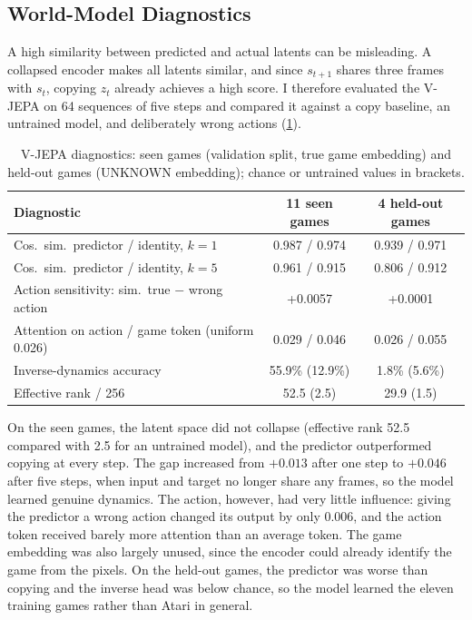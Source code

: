 \documentclass[runningheads]{llncs}
\begin{document}
\FloatBarrier
\subsection{World-Model Diagnostics}
\label{sec:jepa-diag}

A high similarity between predicted and actual latents can be misleading. A collapsed encoder
makes all latents similar, and since $s_{t+1}$ shares three frames with $s_t$, copying $z_t$
already achieves a high score. I therefore evaluated the V-JEPA on 64 sequences of five steps
and compared it against a copy baseline, an untrained model, and deliberately wrong actions
(\cref{tab:jepa}).

\begin{table}[!htbp]
\centering
\caption{V-JEPA diagnostics: seen games (validation split, true game embedding) and held-out
games (UNKNOWN embedding); chance or untrained values in brackets.}
\label{tab:jepa}
\footnotesize\setlength{\tabcolsep}{4pt}
\begin{tabular}{@{}lcc@{}}
\toprule
Diagnostic & 11 seen games & 4 held-out games \\
\midrule
Cos.\ sim.\ predictor / identity, $k=1$ & 0.987 / 0.974 & 0.939 / 0.971 \\
Cos.\ sim.\ predictor / identity, $k=5$ & 0.961 / 0.915 & 0.806 / 0.912 \\
Action sensitivity: sim.\ true $-$ wrong action & +0.0057 & +0.0001 \\
Attention on action / game token (uniform 0.026) & 0.029 / 0.046 & 0.026 / 0.055 \\
Inverse-dynamics accuracy & 55.9\% (12.9\%) & 1.8\% (5.6\%) \\
Effective rank / 256 & 52.5 (2.5) & 29.9 (1.5) \\
\bottomrule
\end{tabular}
\end{table}

On the seen games, the latent space did not collapse (effective rank 52.5 compared with 2.5 for
an untrained model), and the predictor outperformed copying at every step. The gap increased
from $+0.013$ after one step to $+0.046$ after five steps, when input and target no longer share any frames, so the model learned genuine dynamics. The action, however, had very little influence: giving the predictor a wrong action changed its output by
only 0.006, and the action token received barely more attention than an average token. The
game embedding was also largely unused, since the encoder could already identify the game from
the pixels. On the held-out games, the predictor was worse than copying and the inverse head was below
chance, so the model learned the eleven training games rather than Atari in general.
\end{document}
